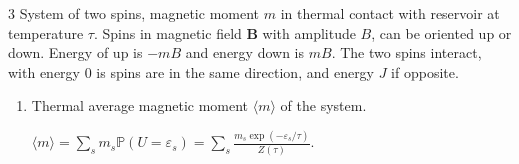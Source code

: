 \documentclass[11pt]{article}
\begin{document}
\begin{problem}{3}
  System of two spins, magnetic moment \( m \) in thermal contact with reservoir at temperature \(\tau\).
  Spins in magnetic field \( \mathbf{B} \) with amplitude \( B \), can be oriented up or down.
  Energy of up is \( -m B \) and energy down is \( m B \).
  The two spins interact, with energy \( 0 \) is spins are in the same direction, and energy \( J \) if opposite.
  \begin{enumerate}[label=(\alph*)]
    \item Thermal average magnetic moment \(\langle m \rangle\) of the system.
          \begin{answer}
            \(\langle m \rangle = \sum\limits_s m_s \mathbb{P}(U=\varepsilon_s) = \sum\limits_s \frac{m_{s}\exp(-\varepsilon_s/\tau)}{Z(\tau)}\).


\end{answer}
\end{enumerate}
\end{problem}
\end{document}

